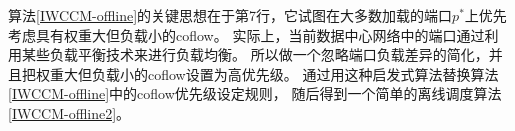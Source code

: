 %
%
% 
% 
% 
% 
%  
%
 
 
 算法\ref{IWCCM-offline}的关键思想在于第7行，它试图在大多数加载的端口$ p^* $上优先考虑具有权重大但负载小的coflow。
 实际上，当前数据中心网络中的端口通过利用某些负载平衡技术来进行负载均衡\cite {dean2008mapreduce}。
 所以做一个忽略端口负载差异的简化，并且把权重大但负载小的coflow设置为高优先级。
 通过用这种启发式算法替换算法\ref{IWCCM-offline}中的coflow优先级设定规则，
 随后得到一个简单的离线调度算法\ref{IWCCM-offline2}。
 
